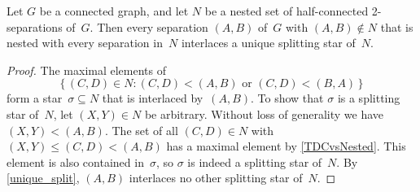 \documentclass{aic}
\newcommand{\se}{\subseteq}
\theoremstyle{plain}
\theoremstyle{definition}
\theoremstyle{plain}
\theoremstyle{plain}
\renewcommand{\le}{\leqslant}
\begin{document}
\begin{cor}\label{crossing2sepsAreSurrounded}
Let $G$ be a connected graph, and let $N$ be a nested set of half-connected 2-separations of~$G$.
Then every separation $(A,B)$ of~$G$ with $(A,B)\notin N$ that is nested with every separation in~$N$ interlaces a unique splitting star of~$N$.
\end{cor}

\begin{proof}
The maximal elements of 
\[
    \{\,(C,D)\in N\colon (C,D)<(A,B)\text{ or }(C,D)<(B,A)\,\}
\]
form a star~$\sigma\se N$ that is interlaced by~$(A,B)$.
To show that $\sigma$ is a splitting star of~$N$, let $(X,Y)\in N$ be arbitrary.
Without loss of generality we have $(X,Y)<(A,B)$.
The set of all $(C,D)\in N$ with $(X,Y)\le (C,D)<(A,B)$ has a maximal element by \autoref{TDCvsNested}.
This element is also contained in~$\sigma$, so $\sigma$ is indeed a splitting star of~$N$.
By \autoref{unique_split}, $(A,B)$ interlaces no other splitting star of~$N$.
\end{proof}
\end{document}
